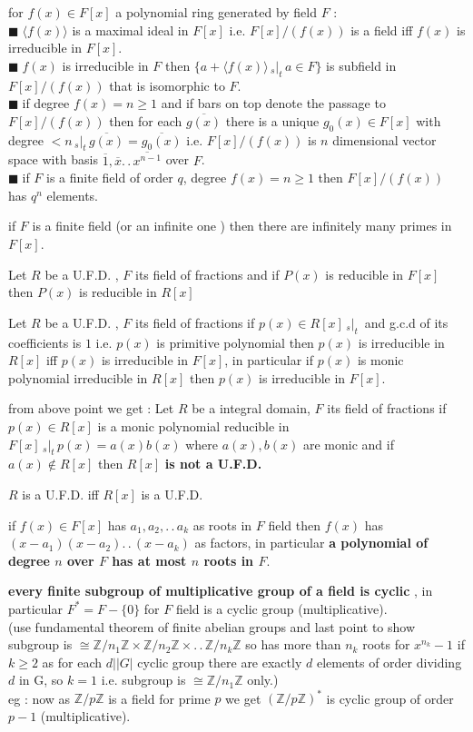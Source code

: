 \documentclass[11pt]{extarticle}
\newcommand{\Z}{\mathbb{Z}}
\newcommand{\ck}{.\,.\,}
\newcommand{\tm}{\times}
\newcommand{\snote}[1]{{\footnotesize(#1)}}
\newcommand{\st}{\,{}_{s}|_t\,}
\newcommand{\gen}[1]{\langle #1 \rangle}
\newcommand{\tbx}[2][]{
	\begin{tcolorbox}[enhanced,breakable,size=small,colback=black!2!white,title={#1},arc is angular, arc=1.5mm,drop fuzzy shadow]
		#2
	\end{tcolorbox}
}
\newcommand{\y}{$\blacksquare\;$}
\begin{document}
\begin{multicols}{2}
\tbx{for $ f(x)\in F[x] $ a polynomial ring generated by field $ F $ :\\
			\y $ \gen{f(x)} $ is a maximal ideal in $ F[x] $ i.e. $ F[x]/(f(x)) $ is a field iff  $ f(x) $ is irreducible in $ F[x] .$\\
		  \y  $ f(x) $ is irreducible in $ F $ then $ \{a+\gen{f(x)}\st a\in F\} $ is subfield in $ F[x]/(f(x)) $ that is isomorphic to $ F .$ \\
			\y if  degree $  f(x) =n\geq 1$ and if bars on top denote the passage to $ F[x]/(f(x))  $ then for each  
			$ \overline{g(x)} $ there is a unique $ g_0(x)\in F[x] $ with degree $ <n \st \overline{g(x)}=\overline{g_0(x)}$ 
			i.e. $ F[x]/(f(x)) $ is $ n $ dimensional vector space with basis $ \overline{1},\overline{x}\ck \overline{x^{n-1}} $  over $ F $.\\
			\y if $ F $ is a finite field of order $ q$, degree $  f(x) =n\geq 1$ then $ F[x]/(f(x))  $ has $ q^n $ elements. \\
			} 
\tbx{if $ F $ is a finite field \snote{or an infinite one } then there are infinitely many primes in $ F[x] $.
			} 
\tbx[\textbf{Gauss Lemma} ]{Let $ R $ be a U.F.D. , $ F $ its field of fractions and if $ P(x) $ is reducible in $ F[x] $ then $ P(x) $ is reducible in $ R[x] $
			} 
\tbx[sort of converse of Gauss Lemma]{ Let $ R $ be a U.F.D. , $ F $ its field of fractions if $ p(x)\in R[x] \st$ and g.c.d of its coefficients is $ 1 $ i.e. 
			$ p(x) $ is primitive polynomial then $ p(x) $ is irreducible in $ R[x] $ iff $p(x) $ is irreducible in $ F[x] $, in particular if $ p(x) $ is monic polynomial irreducible in $ R[x] $ then $ p(x) $ is irreducible in $ F[x] $.
			} 
\tbx{from above point we get : Let $ R $ be a integral domain, $ F $ its field of fractions if $ p(x)\in R[x] $ is a monic polynomial reducible in  $F[x]  \st p(x) =a(x)b(x)$ where $ a(x),b(x)$ are monic and if $ a(x) \notin R[x]$ then 
			$ R[x] $ \textbf{is not a U.F.D. } 
			} 
\tbx{$ R $ is a U.F.D. iff $R[x]$ is a U.F.D.
			} 
			
\tbx{if $ f(x) \in F[x]$ has $ a_1,a_2,\ck a_k $ as roots in $ F $ field then $ f(x) $ has $ (x-a_1)(x-a_2)\ck (x-a_k) $ as factors, in particular \textbf{a polynomial of degree $ n $ over $ F $ has at most $ n $ roots in $ F .$}
} 
\tbx{\textbf{every finite subgroup of multiplicative group of a field is cyclic} , in particular $ F^*=F-\{0\} $ for $ F $ field is a cyclic group (multiplicative). \\
	\snote{use fundamental theorem of finite abelian groups and last point to show subgroup is $ \cong \Z/n_1\Z\tm 
		\Z/n_2\Z\tm \ck \Z/n_k\Z$ so has more than $ n_k $ roots for $ x^{n_k}-1 $  if $ k\geq 2 $ as for each $ d||G| $ cyclic group there are exactly $ d $ elements of order dividing $ d $ in G, so $ k=1 $ i.e.  subgroup is $ \cong \Z/n_1\Z$ only.}\\
	eg : now as $ \Z/p\Z $ is a field for prime $ p $ we get $ (\Z/p\Z )^* $ is cyclic group of order $ p-1 $ (multiplicative).}


\end{multicols}
\end{document}
